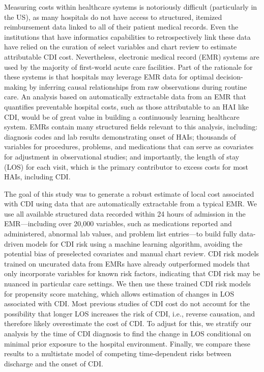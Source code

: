 Measuring costs within healthcare systems is notoriously difficult (particularly in the US), as many hospitals do not have access to structured, itemized reimbursement data linked to all of their patient medical records.\autocite{Cooper2015} Even the institutions that have informatics capabilities to retrospectively link these data have relied on the curation of select variables and chart review to estimate attributable CDI cost.\autocite{Dubberke2008,Dubberke2014,Greco2015} Nevertheless, electronic medical record (EMR) systems are used by the majority of first-world acute care facilities.\autocite{Gray2011,Henry2016} Part of the rationale for these systems is that hospitals may leverage EMR data for optimal decision-making by inferring causal relationships from raw observations during routine care.\autocite{Dahabreh2014,Etheredge2007,Pak2015} An analysis based on automatically extractable data from an EMR that quantifies preventable hospital costs, such as those attributable to an HAI like CDI, would be of great value in building a continuously learning healthcare system.\autocite{Krumholz2016} EMRs contain many structured fields relevant to this analysis, including: diagnosis codes and lab results demonstrating onset of HAIs; thousands of variables for procedures, problems, and medications that can serve as covariates for adjustment in observational studies; and importantly, the length of stay (LOS) for each visit, which is the primary contributor to excess costs for most HAIs, including CDI.\autocite{McGlone2012,Wilcox1996,Zimlichman2013}

The goal of this study was to generate a robust estimate of local cost associated with CDI using data that are automatically extractable from a typical EMR. We use all available structured data recorded within 24 hours of admission in the EMR—including over 20,000 variables, such as medications reported and administered, abnormal lab values, and problem list entries—to build fully data-driven models for CDI risk using a machine learning algorithm, avoiding the potential bias of preselected covariates and manual chart review. CDI risk models trained on uncurated data from EMRs have already outperformed models that only incorporate variables for known risk factors, indicating that CDI risk may be nuanced in particular care settings.\autocite{Wiens2014} We then use these trained CDI risk models for propensity score matching, which allows estimation of changes in LOS associated with CDI. Most previous studies of CDI cost do not account for the possibility that longer LOS increases the risk of CDI, i.e., reverse causation, and therefore likely overestimate the cost of CDI.\autocite{Mitchell2014,Stevens2015} To adjust for this, we stratify our analysis by the time of CDI diagnosis to find the change in LOS conditional on minimal prior exposure to the hospital environment. Finally, we compare these results to a multistate model of competing time-dependent risks between discharge and the onset of CDI.

